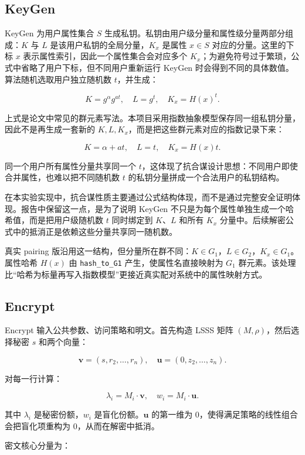 \subsection{KeyGen}

KeyGen 为用户属性集合 $S$ 生成私钥。私钥由用户级分量和属性级分量两部分组成：$K$ 与 $L$ 是该用户私钥的全局分量，$K_x$ 是属性 $x\in S$ 对应的分量。这里的下标 $x$ 表示属性索引，因此一个属性集合会对应多个 $K_x$；为避免符号过于繁琐，公式中省略了用户下标，但不同用户重新运行 KeyGen 时会得到不同的具体数值。算法随机选取用户独立随机数 $t$，并生成：

\[
    K=g^\alpha g^{at},\quad L=g^t,\quad K_x=H(x)^t.
\]

上式是论文中常见的群元素写法。本项目采用指数抽象模型保存同一组私钥分量，因此不是再生成一套新的 $K,L,K_x$，而是把这些群元素对应的指数记录下来：

\[
    K=\alpha+at,\quad L=t,\quad K_x=H(x)t.
\]

同一个用户所有属性分量共享同一个 $t$，这体现了抗合谋设计思想：不同用户即使合并属性，也难以把不同随机数 $t$ 的私钥分量拼成一个合法用户的私钥结构。

在本实验实现中，抗合谋性质主要通过公式结构体现，而不是通过完整安全证明体现。报告中保留这一点，是为了说明 KeyGen 不只是为每个属性单独生成一个哈希值，而是把用户级随机数 $t$ 同时绑定到 $K$、$L$ 和所有 $K_x$ 分量中。后续解密公式中的抵消正是依赖这些分量共享同一随机数。

真实 pairing 版沿用这一结构，但分量所在群不同：$K\in G_1$，$L\in G_2$，$K_x\in G_1$。属性哈希 $H(x)$ 由 \verb|hash_to_G1| 产生，使属性名直接映射为 $G_1$ 群元素。该处理比“哈希为标量再写入指数模型”更接近真实配对系统中的属性映射方式。

\subsection{Encrypt}

Encrypt 输入公共参数、访问策略和明文。首先构造 LSSS 矩阵 $(M,\rho)$，然后选择秘密 $s$ 和两个向量：

\[
    \mathbf{v}=(s,r_2,\dots,r_n),\quad
    \mathbf{u}=(0,z_2,\dots,z_n).
\]

对每一行计算：

\[
    \lambda_i=M_i\cdot \mathbf{v},\quad
    w_i=M_i\cdot \mathbf{u}.
\]

其中 $\lambda_i$ 是秘密份额，$w_i$ 是盲化份额。$\mathbf{u}$ 的第一维为 $0$，使得满足策略的线性组合会把盲化项重构为 $0$，从而在解密中抵消。

密文核心分量为：

